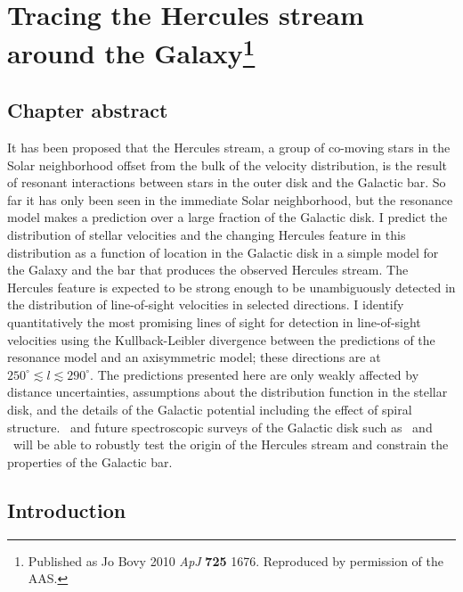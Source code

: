 \chapter[Tracing the Hercules streams around the Galaxy]{Tracing the Hercules stream around the Galaxy\protect\footnote{Published as Jo Bovy 2010 \emph{ApJ} {\bf 725} 1676. Reproduced by permission of the AAS.}}

\section{Chapter abstract}
It has been proposed that the Hercules stream, a group of co-moving
stars in the Solar neighborhood offset from the bulk of the velocity
distribution, is the result of resonant interactions between stars in
the outer disk and the Galactic bar. So far it has only been seen in
the immediate Solar neighborhood, but the resonance model makes a
prediction over a large fraction of the Galactic disk. I predict the
distribution of stellar velocities and the changing Hercules feature
in this distribution as a function of location in the Galactic disk in
a simple model for the Galaxy and the bar that produces the observed
Hercules stream. The Hercules feature is expected to be strong enough
to be unambiguously detected in the distribution of line-of-sight
velocities in selected directions. I identify quantitatively the most
promising lines of sight for detection in line-of-sight velocities
using the Kullback-Leibler divergence between the predictions of the
resonance model and an axisymmetric model; these directions are at
$250^{\circ} \lesssim l \lesssim 290^{\circ}$. The predictions
presented here are only weakly affected by distance uncertainties,
assumptions about the distribution function in the stellar disk, and
the details of the Galactic potential including the effect of spiral
structure. \Gaia\ and future spectroscopic surveys of the Galactic
disk such as \apogee\ and \hermes\ will be able to robustly test the
origin of the Hercules stream and constrain the properties of the
Galactic bar.


\section{Introduction}


